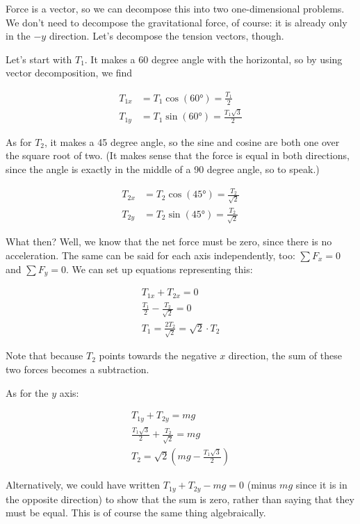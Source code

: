 Force is a vector, so we can decompose this into two one-dimensional problems. We don't need to decompose the gravitational force, of course: it is already only in the $-y$ direction. Let's decompose the tension vectors, though.

Let's start with $T_1$. It makes a 60 degree angle with the horizontal, so by using vector decomposition, we find

\begin{align}
T_{1x} &= T_1 \cos(\ang{60}) = \frac{T_1}{2}\\
T_{1y} &= T_1 \sin(\ang{60}) = \frac{T_1 \sqrt{3}}{2}
\end{align}

As for $T_2$, it makes a 45 degree angle, so the sine and cosine are both one over the square root of two. (It makes sense that the force is equal in both directions, since the angle is exactly in the middle of a 90 degree angle, so to speak.)

\begin{align}
T_{2x} &= T_2 \cos(\ang{45}) = \frac{T_2}{\sqrt{2}}\\
T_{2y} &= T_2 \sin(\ang{45}) = \frac{T_2}{\sqrt{2}}
\end{align}

What then? Well, we know that the net force must be zero, since there is no acceleration. The same can be said for each axis independently, too: $\sum F_x = 0$ and $\sum F_y = 0$. We can set up equations representing this:

\begin{align}
T_{1x} + T_{2x} = 0\\
\frac{T_1}{2} - \frac{T_2}{\sqrt{2}} = 0\\
T_1 = \frac{2 T_2}{\sqrt{2}} = \sqrt{2} \cdot T_2 \label{eq:lec6_t1}
\end{align}

Note that because $T_2$ points towards the negative $x$ direction, the sum of these two forces becomes a subtraction.

As for the $y$ axis:

\begin{align}
T_{1y} + T_{2y} = m g\\
\frac{T_1 \sqrt{3}}{2} + \frac{T_2}{\sqrt{2}} = m g\\
T_2 = \sqrt{2}\left(m g - \frac{T_1 \sqrt{3}}{2}\right)
\end{align}

Alternatively, we could have written $T_{1y} + T_{2y} - m g = 0$ (minus $m g$ since it is in the opposite direction) to show that the sum is zero, rather than saying that they must be equal. This is of course the same thing algebraically.

